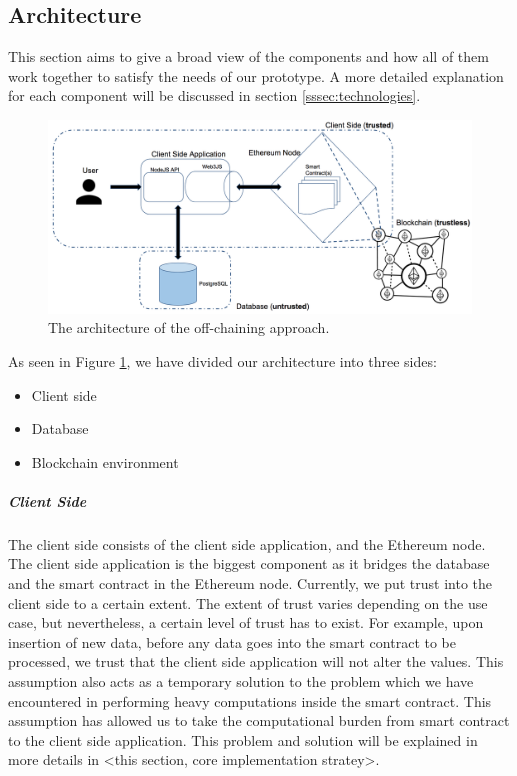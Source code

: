 \subsection{Architecture}

This section aims to give a broad view of the components and how all of them work together to satisfy the needs of our prototype. A more detailed explanation for each component will be discussed in section \ref{sssec:technologies}.

\begin{figure}[t]%
\centering
\includegraphics[width=1.0\textwidth]{images/architecture.png}
\caption{\label{fig:architecture}The architecture of the off-chaining approach.}
\end{figure}

As seen in Figure \ref{fig:architecture}, we have divided our architecture into three sides:
\begin{itemize}
\item Client side
\item Database
\item Blockchain environment
\end{itemize}

\subparagraph{Client Side}
The client side consists of the client side application, and the Ethereum node. The client side application is the biggest component as it bridges the database and the smart contract in the Ethereum node. Currently, we put trust into the client side to a certain extent. The extent of trust varies depending on the use case, but nevertheless, a certain level of trust has to exist. For example, upon insertion of new data, before any data goes into the smart contract to be processed, we trust that the client side application will not alter the values. This assumption also acts as a temporary solution to the problem which we have encountered in performing heavy computations inside the smart contract. This assumption has allowed us to take the computational burden from smart contract to the client side application. This problem and solution will be explained in more details in <this section, core implementation stratey>.

